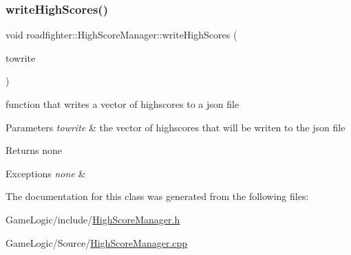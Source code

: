 \subsubsection{\texorpdfstring{write\+High\+Scores()}{writeHighScores()}}
{\footnotesize\ttfamily void roadfighter\+::\+High\+Score\+Manager\+::write\+High\+Scores (\begin{DoxyParamCaption}\item[{std\+::vector$<$ \hyperlink{structroadfighter_1_1highScore}{high\+Score} $>$ \&}]{towrite }\end{DoxyParamCaption})\hspace{0.3cm}{\ttfamily [static]}}

function that writes a vector of highscores to a json file 
\begin{DoxyParams}{Parameters}
{\em towrite} & the vector of highscores that will be writen to the json file \\
\hline
\end{DoxyParams}
\begin{DoxyReturn}{Returns}
none 
\end{DoxyReturn}

\begin{DoxyExceptions}{Exceptions}
{\em none} & \\
\hline
\end{DoxyExceptions}


The documentation for this class was generated from the following files\+:\begin{DoxyCompactItemize}
\item 
Game\+Logic/include/\hyperlink{HighScoreManager_8h}{High\+Score\+Manager.\+h}\item 
Game\+Logic/\+Source/\hyperlink{HighScoreManager_8cpp}{High\+Score\+Manager.\+cpp}\end{DoxyCompactItemize}
